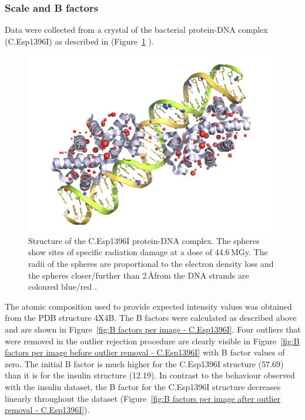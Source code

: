 \subsubsection{Scale and B factors}
\label{subs:Scale and B factors - C.Esp1396I}
Data were collected from a crystal of the bacterial protein-DNA complex (C.Esp1396I) as described in \cite{bury2015radiation} (Figure~\ref{fig:C.Esp1396I structure} ).
\begin{figure}[ht!]
    \centering
    \includegraphics[width=1.0\textwidth]{figures/datared/JSRcoverpic_nobackground.png}
    \caption{Structure of the C.Esp1396I protein-DNA complex.
    The spheres show sites of specific radiation damage at a dose of 44.6$\,$MGy.
    The radii of the spheres are proportional to the electron density loss and the spheres closer/further than 2$\,$\AA from the DNA strands are coloured blue/red \cite{bury2015radiation}.}
    \label{fig:C.Esp1396I structure}
\end{figure}
The atomic composition used to provide expected intensity values was obtained from the PDB structure 4X4B.
The B factors were calculated as described above and are shown in Figure~\ref{fig:B factors per image - C.Esp1396I}.
Four outliers that were removed in the outlier rejection procedure are clearly visible in Figure~\ref{fig:B factors per image before outlier removal - C.Esp1396I} with B factor values of zero.
The initial B factor is much higher for the C.Esp1396I structure (57.69) than it is for the insulin structure (12.19).
In contrast to the behaviour observed with the insulin dataset, the B factor for the C.Esp1396I structure decreases linearly throughout the dataset (Figure~\ref{fig:B factors per image after outlier removal - C.Esp1396I}).
